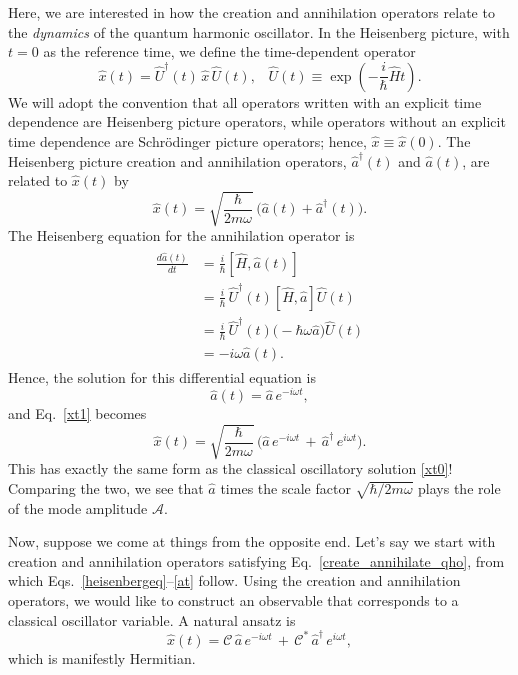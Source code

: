 \documentclass[pra,12pt]{revtex4}
\begin{document}
Here, we are interested in how the creation and annihilation operators
relate to the \textit{dynamics} of the quantum harmonic oscillator.
In the Heisenberg picture, with $t = 0$ as the reference time, we
define the time-dependent operator
\begin{equation}
  \hat{x}(t) = \hat{U}^\dagger(t) \,\hat{x}\, \hat{U}(t), \;\;\;
  \hat{U}(t) \equiv \exp\left(-\frac{i}{\hbar}\hat{H}t\right).
\end{equation}
We will adopt the convention that all operators written with an
explicit time dependence are Heisenberg picture operators, while
operators without an explicit time dependence are Schr\"odinger
picture operators; hence, $\hat{x} \equiv \hat{x}(0)$.  The Heisenberg
picture creation and annihilation operators, $\hat{a}^\dagger(t)$ and
$\hat{a}(t)$, are related to $\hat{x}(t)$ by
\begin{equation}
  \hat{x}(t) = \sqrt{\frac{\hbar}{2m\omega}} \, \Big(\hat{a}(t)+\hat{a}^\dagger(t)\Big).
  \label{xt1}
\end{equation}
The Heisenberg equation for the annihilation operator is
\begin{align}
  \begin{aligned}
  \frac{d\hat{a}(t)}{dt} &= \frac{i}{\hbar} \left[\hat{H},\hat{a}(t)\right] \\
  &= \frac{i}{\hbar} \,\hat{U}^\dagger(t) \left[\hat{H},\hat{a}\right] \hat{U}(t) \\
  &= \frac{i}{\hbar} \,\hat{U}^\dagger(t) \Big(-\hbar\omega \hat{a}\Big) \hat{U}(t) \\
  &= -i\omega \hat{a}(t).
  \end{aligned}
  \label{heisenbergeq}
\end{align}
Hence, the solution for this differential equation is
\begin{equation}
  \hat{a}(t) = \hat{a} \, e^{-i\omega t},
  \label{at}
\end{equation}
and Eq.~\eqref{xt1} becomes
\begin{equation}
  \hat{x}(t) = \sqrt{\frac{\hbar}{2m\omega}} \,
  \Big(\hat{a} \,e^{-i\omega t} \,+\,
  \hat{a}^\dagger\, e^{i\omega t}\Big).
  \label{xtquantum}
\end{equation}
This has exactly the same form as the classical oscillatory solution
\eqref{xt0}!  Comparing the two, we see that $\hat{a}$ times the scale
factor $\sqrt{\hbar/2m\omega}$ plays the role of the mode amplitude
$\mathcal{A}$.

Now, suppose we come at things from the opposite end.  Let's say we
start with creation and annihilation operators satisfying
Eq.~\eqref{create_annihilate_qho}, from which
Eqs.~\eqref{heisenbergeq}--\eqref{at} follow.  Using the creation and
annihilation operators, we would like to construct an observable that
corresponds to a classical oscillator variable.  A natural ansatz is
\begin{equation}
  \hat{x}(t) = 
  \mathcal{C}\, \hat{a} \,e^{-i\omega t} \,+\,
  \mathcal{C}^*\, \hat{a}^\dagger\, e^{i\omega t},
  \label{xtc}
\end{equation}
which is manifestly Hermitian.
\end{document}
